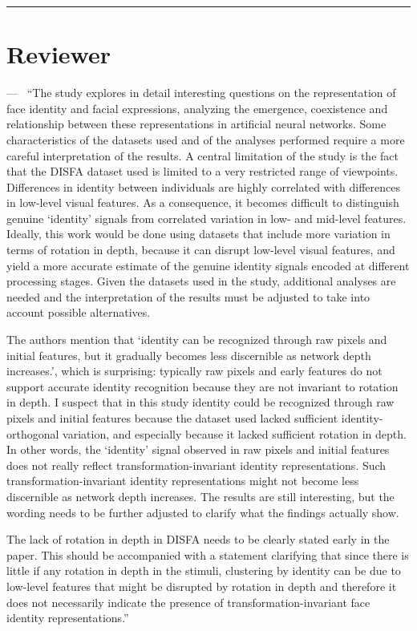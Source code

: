 \documentclass[11pt]{article}
\newcounter{reviewer}
\newcounter{point}[reviewer]
\renewcommand{\thepoint}{Comment\,\thereviewer.\arabic{point}}
\newenvironment{point}
   {\refstepcounter{point} \bigskip \noindent {\textbf{\thepoint} } ---\ }
   {\par }
\newcommand{\reviewersection}{\stepcounter{reviewer} \bigskip \hrule
                  \section*{Reviewer \thereviewer}}
\begin{document}
\reviewersection

\begin{point}
``The study explores in detail interesting questions on the representation of face identity and facial
expressions, analyzing the emergence, coexistence and relationship between these representations in
artificial neural networks. Some characteristics of the datasets used and of the analyses performed
require a more careful interpretation of the results. A central limitation of the study is the fact that
the DISFA dataset used is limited to a very restricted range of viewpoints. Differences in identity
between individuals are highly correlated with differences in low-level visual features. As a
consequence, it becomes difficult to distinguish genuine `identity' signals from correlated variation
in low- and mid-level features. Ideally, this work would be done using datasets that include more
variation in terms of rotation in depth, because it can disrupt low-level visual features, and yield a
more accurate estimate of the genuine identity signals encoded at different processing stages. Given
the datasets used in the study, additional analyses are needed and the interpretation of the results
must be adjusted to take into account possible alternatives.

The authors mention that `identity can be recognized through raw pixels and initial features, but it
gradually becomes less discernible as network depth increases.', which is surprising: typically raw
pixels and early features do not support accurate identity recognition because they are not invariant
to rotation in depth. I suspect that in this study identity could be recognized through raw pixels and
initial features because the dataset used lacked sufficient identity-orthogonal variation, and
especially because it lacked sufficient rotation in depth. In other words, the `identity' signal
observed in raw pixels and initial features does not really reflect transformation-invariant identity
representations. Such transformation-invariant identity representations might not become less
discernible as network depth increases. The results are still interesting, but the wording needs to be
further adjusted to clarify what the findings actually show.

The lack of rotation in depth in DISFA needs to be clearly stated early in the paper. This should be
accompanied with a statement clarifying that since there is little if any rotation in depth in the
stimuli, clustering by identity can be due to low-level features that might be disrupted by rotation in
depth and therefore it does not necessarily indicate the presence of transformation-invariant face
identity representations.''
\label{comment_2_1}
\end{point}
\end{document}
